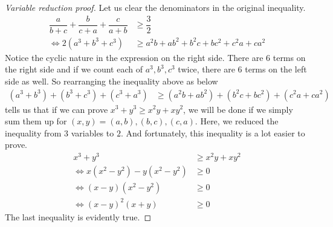 \documentclass{subfile}
\begin{document}
		\begin{proof}[Variable reduction proof]
			Let us clear the denominators in the original inequality.
				\begin{align*}
					\dfrac{a}{b+c}+\dfrac{b}{c+a}+\dfrac{c}{a+b}
						& \geq\dfrac{3}{2}\\
					\iff2(a^3+b^3+c^3)
						& \geq a^2b+ab^2+b^2c+bc^2+c^2a+ca^2
				\end{align*}
			Notice the cyclic nature in the expression on the right side. There are $6$ terms on the right side and if we count each of $a^3,b^3,c^3$ twice, there are $6$ terms on the left side as well. So rearranging the inequality above as below
				\begin{align*}
					(a^3+b^3)+(b^3+c^3)+(c^3+a^3)
						& \geq (a^2b+ab^2)+(b^2c+bc^2)+(c^2a+ca^2)
				\end{align*}
			tells us that if we can prove $x^3+y^3\geq x^2y+xy^2$, we will be done if we simply sum them up for $(x,y)=(a,b),(b,c),(c,a)$. Here, we reduced the inequality from $3$ variables to $2$. And fortunately, this inequality is a lot easier to prove.
				\begin{align*}
					x^3+y^3
						& \geq x^2y+xy^2\\
					\iff x(x^2-y^2)-y(x^2-y^2)
						& \geq0\\
					\iff (x-y)(x^2-y^2)
						& \geq0\\
					\iff(x-y)^2(x+y)
						& \geq0
				\end{align*}
			The last inequality is evidently true.
		\end{proof}
	
\end{document}
